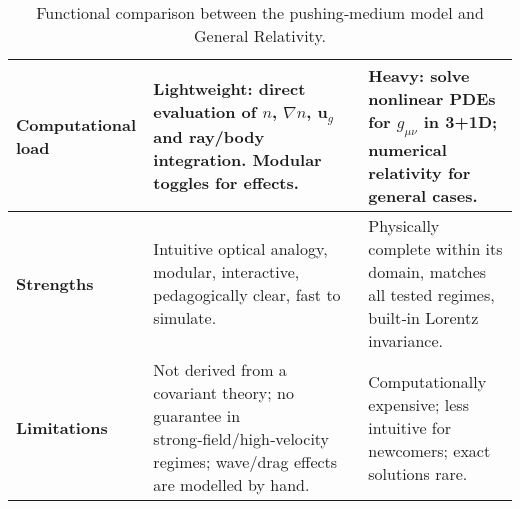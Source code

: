 \begin{table}[h!]
\begin{tabularx}{\textwidth}{|p{3cm}|X|X|}
\hline
\textbf{Computational load} &
Lightweight: direct evaluation of $n$, $\nabla n$, $\mathbf{u}_g$ and ray/body integration. Modular toggles for effects. &
Heavy: solve nonlinear PDEs for $g_{\mu\nu}$ in 3+1D; numerical relativity for general cases. \\
\hline
\textbf{Strengths} &
Intuitive optical analogy, modular, interactive, pedagogically clear, fast to simulate. &
Physically complete within its domain, matches all tested regimes, built‑in Lorentz invariance. \\
\hline
\textbf{Limitations} &
Not derived from a covariant theory; no guarantee in strong‑field/high‑velocity regimes; wave/drag effects are modelled by hand. &
Computationally expensive; less intuitive for newcomers; exact solutions rare. \\
\hline
\end{tabularx}
\caption{Functional comparison between the pushing‑medium model and General Relativity.}
\end{table}

